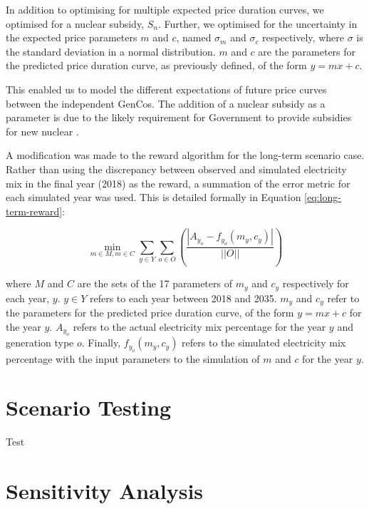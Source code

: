 In addition to optimising for multiple expected price duration curves, we optimised for a nuclear subsidy, $S_n$. Further, we optimised for the uncertainty in the expected price parameters $m$ and $c$, named $\sigma_m$ and $\sigma_c$ respectively, where $\sigma$ is the standard deviation in a normal distribution. $m$ and $c$ are the parameters for the predicted price duration curve, as previously defined, of the form $y=mx+c$.  

This enabled us to model the different expectations of future price curves between the independent GenCos. The addition of a nuclear subsidy as a parameter is due to the likely requirement for Government to provide subsidies for new nuclear \cite{Suna2016}.

A modification was made to the reward algorithm for the long-term scenario case. Rather than using the discrepancy between observed and simulated electricity mix in the final year (2018) as the reward, a summation of the error metric for each simulated year was used. This is detailed formally in Equation \ref{eq:long-term-reward}:


\begin{equation}
\label{eq:long-term-reward}
\min_{m\in M,m\in C} 
\sum\limits_{y\in Y}
\sum\limits_{o\in O}\left(
\frac{\left|A_{y_o}-f_{y_o}(m_y,c_y)\right|}
{\left|\left|O\right|\right|}
\right)
\end{equation}

\noindent where $M$ and $C$ are the sets of the 17 parameters of $m_y$ and $c_y$ respectively for each year, $y$. $y\in Y$ refers to each year between 2018 and 2035. $m_y$ and $c_y$ refer to the parameters for the predicted price duration curve, of the form $y=mx+c$ for the year $y$. $A_{y_o}$ refers to the actual electricity mix percentage for the year $y$ and generation type $o$. Finally, $f_{y_o}(m_y,c_y)$ refers to the simulated electricity mix percentage with the input parameters to the simulation of $m$ and $c$ for the year $y$.







\section{Scenario Testing}

Test


\section{Sensitivity Analysis}

